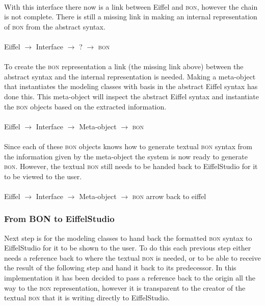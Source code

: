\paragraph{}
With this interface there now is a link between Eiffel and \textsc{bon}, however the chain is not complete. There is still a missing link in making an internal representation of \textsc{bon} from the abstract syntax.

\paragraph{}
Eiffel $\rightarrow$ Interface $\rightarrow$ ? $\rightarrow$ \textsc{bon}

\paragraph{}
To create the \textsc{bon} representation a link (the missing link above) between the abstract syntax and the internal representation is needed. Making a meta-object that instantiates the modeling classes with basis in the abstract Eiffel syntax has done this. This meta-object will inspect the abstract Eiffel syntax and instantiate the \textsc{bon} objects based on the extracted information.

\paragraph{}
Eiffel $\rightarrow$ Interface $\rightarrow$ Meta-object $\rightarrow$ \textsc{bon}

\paragraph{}
Since each of these \textsc{bon} objects knows how to generate textual \textsc{bon} syntax from the information given by the meta-object the system is now ready to generate \textsc{bon}. However, the textual \textsc{bon} still needs to be handed back to EiffelStudio for it to be viewed to the user.

\paragraph{}
Eiffel $\rightarrow$ Interface $\rightarrow$ Meta-object $\rightarrow$ \textsc{bon} \newline
arrow back to eiffel

\subsubsection{From BON to EiffelStudio}
Next step is for the modeling classes to hand back the formatted \textsc{bon} syntax to EiffelStudio for it to be shown to the user. To do this each previous step either needs a reference back to where the textual \textsc{bon} is needed, or to be able to receive the result of the following step and hand it back to its predecessor. In this implementation it has been decided to pass a reference back to the origin all the way to the \textsc{bon} representation, however it is transparent to the creator of the textual \textsc{bon} that it is writing directly to EiffelStudio.

